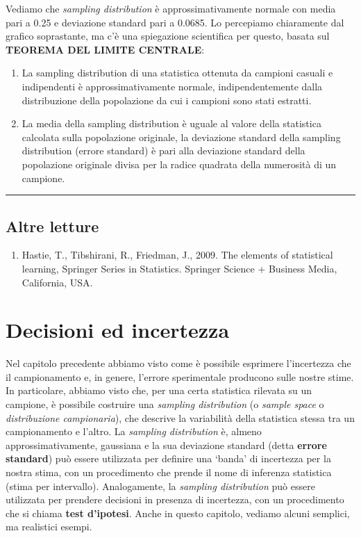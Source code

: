 \documentclass[a4paper,12pt,oneside]{book}
\providecommand{\tightlist}{%
  \setlength{\itemsep}{0pt}\setlength{\parskip}{0pt}}
\begin{document}
Vediamo che \emph{sampling distribution} è approssimativamente normale con media pari a 0.25 e deviazione standard pari a 0.0685. Lo percepiamo chiaramente dal grafico soprastante, ma c'è una spiegazione scientifica per questo, basata sul \textbf{TEOREMA DEL LIMITE CENTRALE}:

\begin{enumerate}
\def\labelenumi{\arabic{enumi}.}
\tightlist
\item
  La sampling distribution di una statistica ottenuta da campioni casuali e indipendenti è approssimativamente normale, indipendentemente dalla distribuzione della popolazione da cui i campioni sono stati estratti.
\item
  La media della sampling distribution è uguale al valore della statistica calcolata sulla popolazione originale, la deviazione standard della sampling distribution (errore standard) è pari alla deviazione standard della popolazione originale divisa per la radice quadrata della numerosità di un campione.
\end{enumerate}

\begin{center}\rule{0.5\linewidth}{0.5pt}\end{center}

\hypertarget{altre-letture-4}{%
\section{Altre letture}\label{altre-letture-4}}

\begin{enumerate}
\def\labelenumi{\arabic{enumi}.}
\tightlist
\item
  Hastie, T., Tibshirani, R., Friedman, J., 2009. The elements of statistical learning, Springer Series in Statistics. Springer Science + Business Media, California, USA.
\end{enumerate}

\hypertarget{decisioni-ed-incertezza}{%
\chapter{Decisioni ed incertezza}\label{decisioni-ed-incertezza}}

Nel capitolo precedente abbiamo visto come è possibile esprimere l'incertezza che il campionamento e, in genere, l'errore sperimentale producono sulle nostre stime. In particolare, abbiamo visto che, per una certa statistica rilevata su un campione, è possibile costruire una \emph{sampling distribution} (o \emph{sample space} o \emph{distribuzione campionaria}), che descrive la variabilità della statistica stessa tra un campionamento e l'altro. La \emph{sampling distribution} è, almeno approssimativamente, gaussiana e la sua deviazione standard (detta \textbf{errore standard}) può essere utilizzata per definire una `banda' di incertezza per la nostra stima, con un procedimento che prende il nome di inferenza statistica (stima per intervallo). Analogamente, la \emph{sampling distribution} può essere utilizzata per prendere decisioni in presenza di incertezza, con un procedimento che si chiama \textbf{test d'ipotesi}. Anche in questo capitolo, vediamo alcuni semplici, ma realistici esempi.
\end{document}
